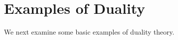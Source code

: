 
\section{Examples of Duality}\label{sec:duality-examples}
\hypertarget{o014.aljabr2.chapter9.duality-examples-a}{ }
We next examine some basic examples of duality theory.


